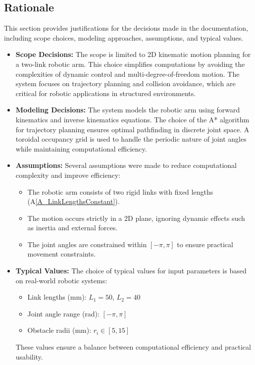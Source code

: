 \documentclass[12pt]{article}
\newcommand{\aref}[1]{A\ref{#1}}
\begin{document}
  \subsection{Rationale}

  This section provides justifications for the decisions made in the documentation, including scope choices, modeling approaches, assumptions, and typical values.
  
  \noindent \begin{itemize}
  
  \item \textbf{Scope Decisions:}  
  The scope is limited to 2D kinematic motion planning for a two-link robotic arm. This choice simplifies computations by avoiding the complexities of dynamic control and multi-degree-of-freedom motion. The system focuses on trajectory planning and collision avoidance, which are critical for robotic applications in structured environments.
  
  \item \textbf{Modeling Decisions:}  
  The system models the robotic arm using forward kinematics and inverse kinematics equations. The choice of the A* algorithm for trajectory planning ensures optimal pathfinding in discrete joint space. A toroidal occupancy grid is used to handle the periodic nature of joint angles while maintaining computational efficiency.
  
  \item \textbf{Assumptions:}  
  Several assumptions were made to reduce computational complexity and improve efficiency:
    \begin{itemize}
      \item The robotic arm consists of two rigid links with fixed lengths (\aref{A_LinkLengthsConstant}).
      \item The motion occurs strictly in a 2D plane, ignoring dynamic effects such as inertia and external forces.
      \item The joint angles are constrained within \([- \pi, \pi]\) to ensure practical movement constraints.
    \end{itemize}
  
  \item \textbf{Typical Values:}  
  The choice of typical values for input parameters is based on real-world robotic systems:
    \begin{itemize}
      \item Link lengths (\si{\milli\metre}): $L_1 = 50$, $L_2 = 40$ 
      \item Joint angle range (\si{\radian}): $[-\pi, \pi]$
      \item Obstacle radii (\si{\milli\metre}): $r_i \in [5, 15]$ 
    \end{itemize}
    These values ensure a balance between computational efficiency and practical usability.
  
  \end{itemize}
  
\end{document}
